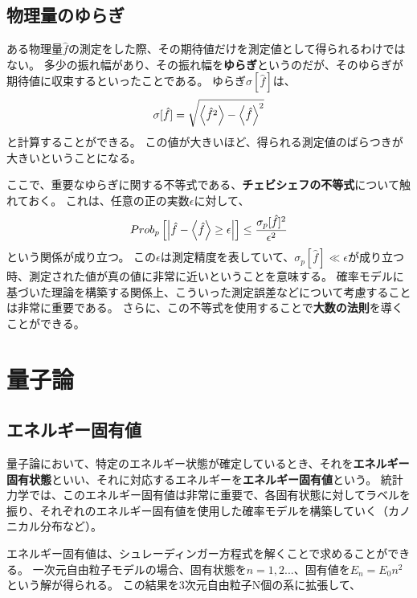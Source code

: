 \documentclass[a4paper]{jsreport}
\begin{document}
        \section{物理量のゆらぎ}
            ある物理量$\hat{f}$の測定をした際、その期待値だけを測定値として得られるわけではない。
            多少の振れ幅があり、その振れ幅を\textbf{ゆらぎ}というのだが、そのゆらぎが期待値に収束するといったことである。
            ゆらぎ$\sigma[\hat{f}]$は、
            \begin{equation}
                \sigma[\hat{f}] = \sqrt{\ev{\hat{f}^2} - \ev{\hat{f}}^2}
            \end{equation}
            と計算することができる。
            この値が大きいほど、得られる測定値のばらつきが大きいということになる。\par
            ここで、重要なゆらぎに関する不等式である、\textbf{チェビシェフの不等式}について触れておく。
            これは、任意の正の実数$\epsilon$に対して、
            \begin{equation}
                Prob_p \left[\abs{\hat{f} - \ev{\hat{f}} \ge \epsilon} \right] \le \frac{\sigma_p[\hat{f}]^2}{\epsilon^2}
            \end{equation}
            という関係が成り立つ。
            この$\epsilon$は測定精度を表していて、$\sigma_p[\hat{f}] \ll \epsilon$が成り立つ時、測定された値が真の値に非常に近いということを意味する。
            確率モデルに基づいた理論を構築する関係上、こういった測定誤差などについて考慮することは非常に重要である。
            さらに、この不等式を使用することで\textbf{大数の法則}を導くことができる。

    \chapter{量子論}
        \section{エネルギー固有値}
            量子論において、特定のエネルギー状態が確定しているとき、それを\textbf{エネルギー固有状態}といい、それに対応するエネルギーを\textbf{エネルギー固有値}という。
            統計力学では、このエネルギー固有値は非常に重要で、各固有状態に対してラベルを振り、それぞれのエネルギー固有値を使用した確率モデルを構築していく（カノニカル分布など）。\par
            エネルギー固有値は、シュレーディンガー方程式を解くことで求めることができる。
            一次元自由粒子モデルの場合、固有状態を$n=1, 2...$、固有値を$E_n=E_0 n^2$という解が得られる。
            この結果を3次元自由粒子N個の系に拡張して、
\end{document}
